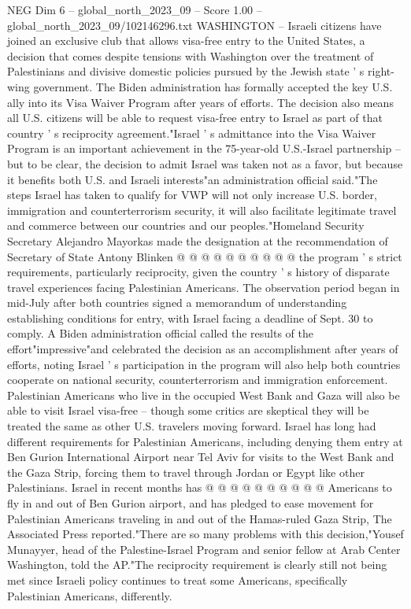 \begin{textsample}{NEG Dim 6 – global\_north\_2023\_09 – Score 1.00 – global\_north\_2023\_09/102146296.txt}  \label{ex:f6_neg_386}
WASHINGTON -- Israeli citizens have joined an exclusive club that allows visa-free entry to the United States, a decision that comes despite tensions with Washington over the treatment of Palestinians and divisive domestic policies pursued by the Jewish state ' s right-wing government.
The Biden administration has formally accepted the key U.S. ally into its Visa Waiver Program after years of efforts.
The decision also means all U.S. citizens will be able to request visa-free entry to Israel as part of that country ' s reciprocity agreement."Israel ' s admittance into the Visa Waiver Program is an important achievement in the 75-year-old U.S.-Israel partnership -- but to be clear, the decision to admit Israel was taken not as a favor, but because it benefits both U.S. and Israeli interests"an administration official said."The steps Israel has taken to qualify for VWP will not only increase U.S. border, immigration and counterterrorism security, it will also facilitate legitimate travel and commerce between our countries and our peoples."Homeland Security Secretary Alejandro Mayorkas made the designation at the recommendation of Secretary of State Antony Blinken @ @ @ @ @ @ @ @ @ @ the program ' s strict requirements, particularly reciprocity, given the country ' s history of disparate travel experiences facing Palestinian Americans.
The observation period began in mid-July after both countries signed a memorandum of understanding establishing conditions for entry, with Israel facing a deadline of Sept. 30 to comply.
A Biden administration official called the results of the effort"impressive"and celebrated the decision as an accomplishment after years of efforts, noting Israel ' s participation in the program will also help both countries cooperate on national security, counterterrorism and immigration enforcement.
Palestinian Americans who live in the occupied West Bank and Gaza will also be able to visit Israel visa-free -- though some critics are skeptical they will be treated the same as other U.S. travelers moving forward.
Israel has long had different requirements for Palestinian Americans, including denying them entry at Ben Gurion International Airport near Tel Aviv for visits to the West Bank and the Gaza Strip, forcing them to travel through Jordan or Egypt like other Palestinians.
Israel in recent months has @ @ @ @ @ @ @ @ @ @ Americans to fly in and out of Ben Gurion airport, and has pledged to ease movement for Palestinian Americans traveling in and out of the Hamas-ruled Gaza Strip, The Associated Press reported."There are so many problems with this decision,"Yousef Munayyer, head of the Palestine-Israel Program and senior fellow at Arab Center Washington, told the AP."The reciprocity requirement is clearly still not being met since Israeli policy continues to treat some Americans, specifically Palestinian Americans, differently.

\end{textsample}
